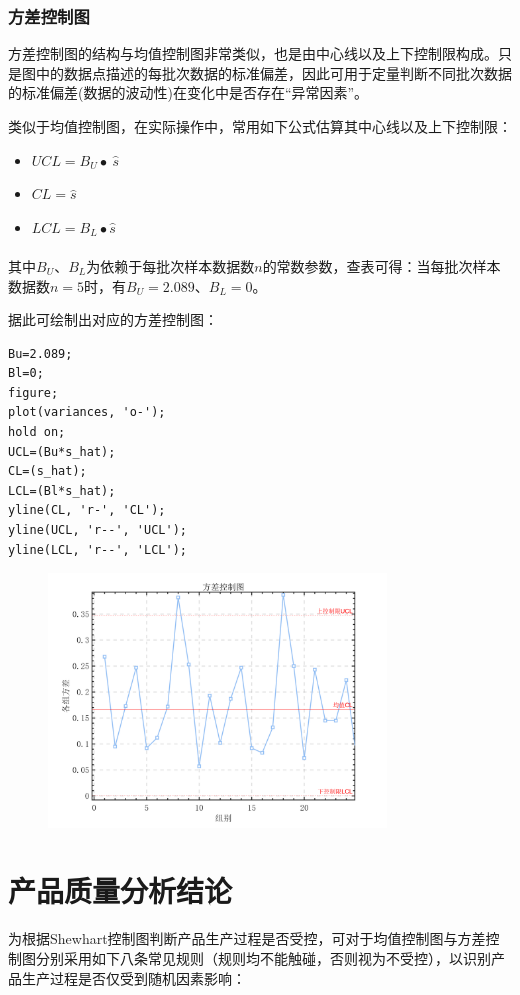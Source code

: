 \documentclass[12pt]{article}  %
\newcommand{\upcite}[1]{\textsuperscript{\textsuperscript{\cite{#1}}}}
\begin{document}
\subsubsection{方差控制图}
方差控制图的结构与均值控制图非常类似，也是由中心线以及上下控制限构成。只是图中的数据点描述的每批次数据的标准偏差，因此可用于定量判断不同批次数据的标准偏差(数据的波动性)在变化中是否存在“异常因素”。

类似于均值控制图，在实际操作中，常用如下公式估算其中心线以及上下控制限： 
\begin{itemize}
	\setlength{\parsep}{0ex} %
	\setlength{\topsep}{2ex} %
	\setlength{\itemsep}{1ex} %
	\item $UCL=B_U\bullet\ \hat{s}$
	\item $CL=\hat{s}$ 
	\item $LCL=B_L\bullet\hat{s}$
\end{itemize}

其中$B_U$、$B_L$为依赖于每批次样本数据数$n$的常数参数，查表\upcite{2}可得：当每批次样本数据数$n=5$时，有$B_U=2.089$、$B_L=0$。

据此可绘制出对应的方差控制图：

\begin{lstlisting}
Bu=2.089;
Bl=0;
figure;
plot(variances, 'o-');
hold on;
UCL=(Bu*s_hat);
CL=(s_hat);
LCL=(Bl*s_hat);
yline(CL, 'r-', 'CL');
yline(UCL, 'r--', 'UCL');
yline(LCL, 'r--', 'LCL');
\end{lstlisting}

\begin{figure}[H]
	\centering
	\includegraphics[width=0.8\textwidth]{4.png}
\end{figure}

\section{产品质量分析结论}	
为根据Shewhart控制图判断产品生产过程是否受控，可对于均值控制图与方差控制图分别采用如下八条常见规则（规则均不能触碰，否则视为不受控），以识别产品生产过程是否仅受到随机因素影响：
\end{document}

